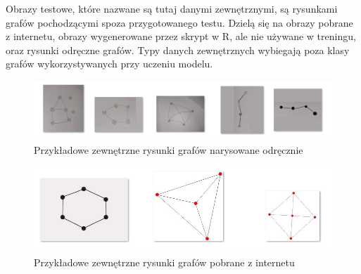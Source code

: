 Obrazy testowe, które nazwane są tutaj danymi zewnętrznymi, są rysunkami grafów pochodzącymi spoza przygotowanego testu.
Dzielą się na obrazy pobrane z internetu, obrazy wygenerowane przez skrypt w R, ale nie używane w treningu,
oraz rysunki odręczne grafów. Typy danych zewnętrznych wybiegają poza klasy grafów wykorzystywanych przy uczeniu modelu.

\begin{figure}[ht]
	\centering
	\includegraphics[width=15.5cm]{resources/model/images/ext-graphs-drawn.png}
	\caption{Przykładowe zewnętrzne rysunki grafów narysowane odręcznie}
	\label{Fig:tests-outside-1}
\end{figure}
\FloatBarrier

\begin{figure}[ht]
	\centering
	\includegraphics[width=15cm]{resources/model/images/ext-graphs-internet.png}
	\caption{Przykładowe zewnętrzne rysunki grafów pobrane z internetu}
	\label{Fig:tests-outside-2}
\end{figure}
\FloatBarrier